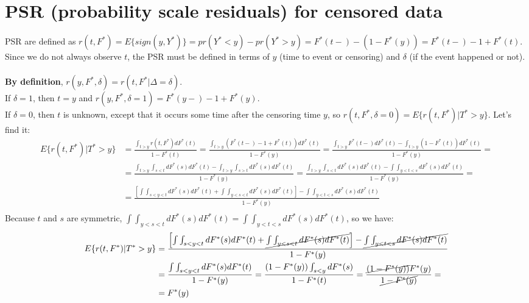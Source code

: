 \documentclass[]{article}
\begin{document}
\section{PSR (probability scale residuals) for censored data}
PSR are defined as $r(t,F^*) = E\{sign(y,Y^*)\} = pr(Y^* < y) - pr(Y^* > y) = F^*(t-) - (1-F^*(y)) = F^*(t-) - 1 + F^*(t)$.\\
Since we do not always observe $t$, the PSR must be defined in terms of $y$ (time to event or censoring) and $\delta$ (if the event happened or not). \\
\\
\textbf{By definition}, $r(y,F^*, \delta) = r(t,F^*|\Delta=\delta)$.\\
If $\delta = 1$, then $t=y$ and $r(y,F^*, \delta=1) = F^*(y-) - 1 + F^*(y)$. \\
If $\delta = 0$, then $t$ is unknown, except that it occurs some time after the censoring time $y$, so $r(t,F^*, \delta=0) = E\{r(t,F^*)|T^*>y\}$. Let's find it:
	$$
	\begin{aligned}
		E\{r(t,F^*)|T^*>y\} &= \frac{\int_{t>y}r(t,F^*)dF^*(t)}{1-F^*(t)}= \frac{\int_{t>y}(F^*(t-) - 1 + F^*(t))dF^*(t)}{1-F^*(y)}= \frac{\int_{t>y}F^*(t-)dF^*(t) - \int_{t>y}(1 - F^*(t))dF^*(t)}{1-F^*(y)}=\\
		&= \frac{\int_{t>y}\int_{s<t}dF^*(s)dF^*(t) - \int_{t>y}\int_{s>t}dF^*(s)dF^*(t)}{1-F^*(y)}= \frac{\int_{t>y}\int_{s<t}dF^*(s)dF^*(t) - \int\int_{y<t<s}dF^*(s)dF^*(t)}{1-F^*(y)}=\\
		&= \frac{\left[\int\int_{s<y<t}dF^*(s)dF^*(t) + \int\int_{y<s<t}dF^*(s)dF^*(t)\right] - \int\int_{y<t<s}dF^*(s)dF^*(t)}{1-F^*(y)}\\
	\end{aligned}
	$$
Because $t$ and $s$ are symmetric, $\int\int_{y<s<t}dF^*(s)dF^*(t) = \int\int_{y<t<s}dF^*(s)dF^*(t)$, so we have:
	$$
	\begin{aligned}
		E\{r(t,F^*)|T^*>y\} &= \frac{\left[\int\int_{s<y<t}dF^*(s)dF^*(t) + \cancel{\int\int_{y<s<t}dF^*(s)dF^*(t)}\right] - \cancel{\int\int_{y<t<s}dF^*(s)dF^*(t)}}{1-F^*(y)}\\
		&= \frac{\int\int_{s<y<t}dF^*(s)dF^*(t)}{1-F^*(y)} = \frac{(1-F^*(y))\int_{s<y}dF^*(s)}{1-F^*(t)} = \frac{\cancel{(1-F^*(y))}F^*(y)}{\cancel{1-F^*(y)}} =\\
		&=F^*(y)
	\end{aligned}
	$$
	
\end{document}
